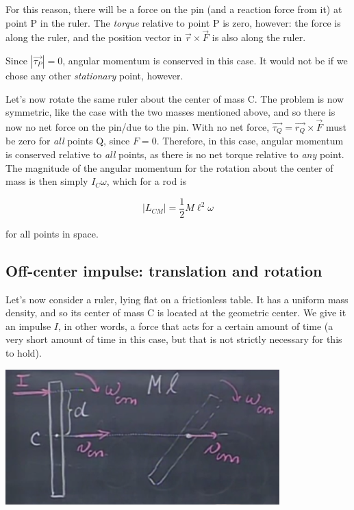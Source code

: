 \documentclass[12pt,a4paper]{report}
\begin{document}
For this reason, there will be a force on the pin (and a reaction force from it) at point P in the ruler. The \emph{torque} relative to point P is zero, however: the force is along the ruler, and the position vector in $\vec{r} \times \vec{F}$ is also along the ruler.

Since $|\vec{\tau_P}| = 0$, angular momentum is conserved in this case. It would not be if we chose any other \emph{stationary} point, however.

Let's now rotate the same ruler about the center of mass C. The problem is now symmetric, like the case with the two masses mentioned above, and so there is now no net force on the pin/due to the pin. With no net force, $\vec{\tau_Q} = \vec{r_Q} \times \vec{F}$ must be zero for \emph{all} points Q, since $F = 0$. Therefore, in this case, angular momentum is conserved relative to \emph{all} points, as there is no net torque relative to \emph{any} point. The magnitude of the angular momentum for the rotation about the center of mass is then simply $I_C \omega$, which for a rod is

\begin{equation}
|L_{CM}| = \frac{1}{2} M \ell^2 \omega
\end{equation}

for all points in space.

\subsection{Off-center impulse: translation and rotation}

Let's now consider a ruler, lying flat on a frictionless table. It has a uniform mass density, and so its center of mass C is located at the geometric center. We give it an impulse $I$, in other words, a force that acts for a certain amount of time (a very short amount of time in this case, but that is not strictly necessary for this to hold).

\begin{center}
\includegraphics[scale=0.7]{Graphics/lec21_ruler_rotation}
\end{center}
\end{document}
